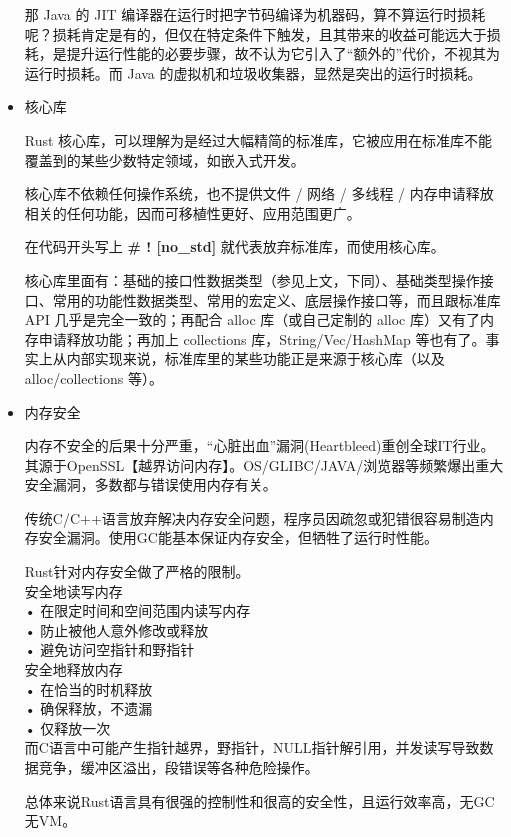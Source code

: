 \documentclass[12pt, a4paper]{article}
\begin{document}
\begin{itemize}
	那 Java 的 JIT 编译器在运行时把字节码编译为机器码，算不算运行时损耗呢？损耗肯定是有的，但仅在特定条件下触发，且其带来的收益可能远大于损耗，是提升运行性能的必要步骤，故不认为它引入了“额外的”代价，不视其为运行时损耗。而 Java 的虚拟机和垃圾收集器，显然是突出的运行时损耗。
	
	\item 核心库
	
	Rust 核心库，可以理解为是经过大幅精简的标准库，它被应用在标准库不能覆盖到的某些少数特定领域，如嵌入式开发。
	
	核心库不依赖任何操作系统，也不提供文件 / 网络 / 多线程 / 内存申请释放相关的任何功能，因而可移植性更好、应用范围更广。
	
	在代码开头写上 \textbf{\# ! [no\_std] }就代表放弃标准库，而使用核心库。
	
	核心库里面有：基础的接口性数据类型（参见上文，下同）、基础类型操作接口、常用的功能性数据类型、常用的宏定义、底层操作接口等，而且跟标准库 API 几乎是完全一致的；再配合 alloc 库（或自己定制的 alloc 库）又有了内存申请释放功能；再加上 collections 库，String/Vec/HashMap 等也有了。事实上从内部实现来说，标准库里的某些功能正是来源于核心库（以及 alloc/collections 等）。
	
	\item 内存安全
	
	内存不安全的后果十分严重，“心脏出血”漏洞(Heartbleed)重创全球IT行业。其源于OpenSSL【越界访问内存】。OS/GLIBC/JAVA/浏览器等频繁爆出重大安全漏洞，多数都与错误使用内存有关。
	
	传统C/C++语言放弃解决内存安全问题，程序员因疏忽或犯错很容易制造内存安全漏洞。使用GC能基本保证内存安全，但牺牲了运行时性能。
	
	Rust针对内存安全做了严格的限制。\\
	安全地读写内存\\
	• 在限定时间和空间范围内读写内存\\
	• 防止被他人意外修改或释放\\
	• 避免访问空指针和野指针\\
	安全地释放内存\\
	• 在恰当的时机释放\\
	• 确保释放，不遗漏\\
	• 仅释放一次\\
	而C语言中可能产生指针越界，野指针，NULL指针解引用，并发读写导致数据竞争，缓冲区溢出，段错误等各种危险操作。
	
	总体来说Rust语言具有很强的控制性和很高的安全性，且运行效率高，无GC无VM。
	\end{itemize}
\end{document}
